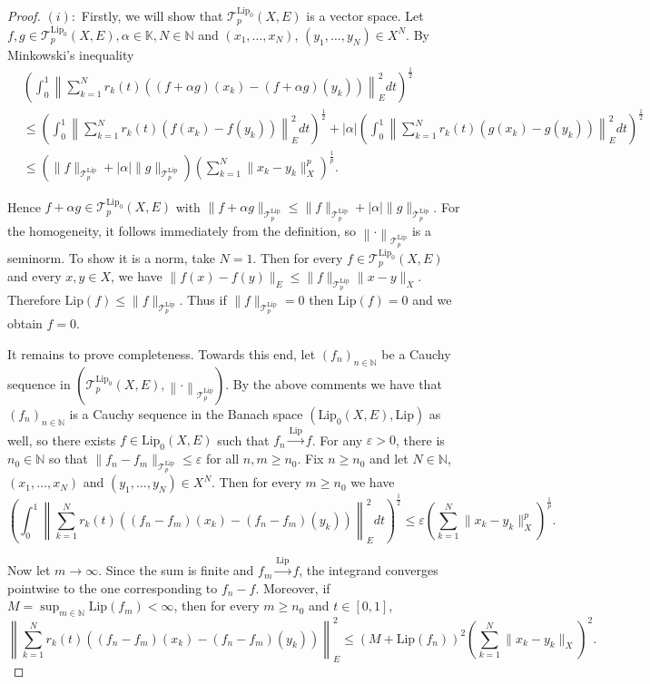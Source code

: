 \documentclass[12pt]{amsart}
\def\T{\mathcal{T}}
\def\K{\mathbb{K}}
\def\N{\mathbb{N}}
\def\Lip{\mathrm{Lip}_0}
\def\Lipnorm{\mathrm{Lip}}
\begin{document}
\begin{proof}
	$(i):$ Firstly, we will show that $\T_p^{\Lip}(X,E)$ is a vector space. Let $f,g \in \T_p^{\Lip}(X,E), \alpha \in \K, N \in \N$ and $(x_1,\ldots,x_N)$, $(y_1,\ldots,y_N) \in X^N$. By Minkowski's inequality
	\begin{align*}
		&\left( \int_0^1\left\| \sum_{k=1}^N r_k(t)((f+\alpha g)(x_k)-(f+\alpha g)(y_k)) \right\|_E^2 dt \right)^{\frac{1}{2}}\\
		&\leq \left( \int_0^1\left\| \sum_{k=1}^N r_k(t)(f(x_k)-f(y_k)) \right\|_E^2 dt \right)^{\frac{1}{2}} + |\alpha| \left( \int_0^1\left\| \sum_{k=1}^N r_k(t)(g(x_k)-g(y_k)) \right\|_E^2 dt \right)^{\frac{1}{2}}\\
		&\leq (\|f\|_{\T_p^{\Lipnorm}}+|\alpha|\|g\|_{\T_p^{\Lipnorm}})\left( \sum_{k=1}^N \|x_k-y_k\|^p_X \right)^{\frac{1}{p}}.
	\end{align*}

	Hence $f+\alpha g \in \T_p^{\Lip}(X,E)$ with $\|f+\alpha g\|_{\T_p^{\Lipnorm}}\leq \|f\|_{\T_p^{\Lipnorm}}+|\alpha|\|g\|_{\T_p^{\Lipnorm}}$. For the homogeneity, it follows immediately from the definition, so $\left\|\cdot\right\|_{\T_p^{\Lipnorm}}$ is a seminorm. To show it is a norm, take $N=1$. Then for every $f \in \T_p^{\Lip}(X,E)$ and every $x,y \in X$, we have $\|f(x)-f(y)\|_E \leq \|f\|_{\T_p^{\Lipnorm}}\|x-y\|_X$. Therefore $\Lipnorm(f) \leq \|f\|_{\T_p^{\Lipnorm}}$. Thus if $\|f\|_{\T_p^{\Lipnorm}}=0$ then $\Lipnorm(f)=0$ and we obtain $f=0$.

	It remains to prove completeness. Towards this end, let $(f_n)_{n\in\N}$ be a Cauchy sequence in $(\T_p^{\Lip}(X,E),\left\|\cdot\right\|_{\T_p^{\Lipnorm}})$. By the above comments we have that $(f_n)_{n\in\N}$ is a Cauchy sequence in the Banach space $(\Lip(X,E),\Lipnorm)$ as well, so there exists $f \in \Lip(X,E)$ such that $f_n \xrightarrow{\Lipnorm} f$. For any $\varepsilon > 0$, there is $n_0 \in \N$ so that $\|f_n-f_m\|_{\T_p^{\Lipnorm}} \leq \varepsilon$ for all $n,m\geq n_0$. Fix $n \geq n_0$ and let $N \in \N$, $(x_1,\ldots,x_N)$ and $(y_1,\ldots,y_N) \in X^N$. Then for every $m \geq n_0$ we have
	$$
	\left(\int_0^1 \left\| \sum_{k=1}^{N} r_k(t)((f_n-f_m)(x_k)-(f_n-f_m)(y_k)) \right\|_E^2 dt \right)^{\frac{1}{2}} \leq \varepsilon \left( \sum_{k=1}^{N} \|x_k-y_k\|_X^p \right)^{\frac{1}{p}}.
	$$

	Now let $m \to \infty$. Since the sum is finite and $f_m \xrightarrow{\Lipnorm} f$, the integrand converges pointwise to the one corresponding to $f_n-f$. Moreover, if $M=\sup_{m\in\N}\Lipnorm(f_m)<\infty$, then for every $m\geq n_0$ and $t\in[0,1]$,
	$$
	\left\|\sum_{k=1}^N r_k(t)((f_n-f_m)(x_k)-(f_n-f_m)(y_k))\right\|_E^2 \leq (M+\Lipnorm(f_n))^2\left(\sum_{k=1}^N\|x_k-y_k\|_X\right)^2. %
	$$


\end{proof}
\end{document}
